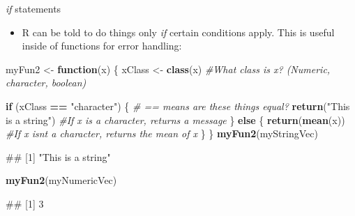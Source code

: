 \documentclass[
  ignorenonframetext,
  aspectratio=169]{beamer}
\newenvironment{Shaded}{\begin{snugshade}}{\end{snugshade}}
\newcommand{\CommentTok}[1]{\textcolor[rgb]{0.56,0.35,0.01}{\textit{#1}}}
\newcommand{\ControlFlowTok}[1]{\textcolor[rgb]{0.13,0.29,0.53}{\textbf{#1}}}
\newcommand{\FunctionTok}[1]{\textcolor[rgb]{0.13,0.29,0.53}{\textbf{#1}}}
\newcommand{\NormalTok}[1]{#1}
\newcommand{\OtherTok}[1]{\textcolor[rgb]{0.56,0.35,0.01}{#1}}
\newcommand{\SpecialCharTok}[1]{\textcolor[rgb]{0.81,0.36,0.00}{\textbf{#1}}}
\newcommand{\StringTok}[1]{\textcolor[rgb]{0.31,0.60,0.02}{#1}}
\providecommand{\tightlist}{%
  \setlength{\itemsep}{0pt}\setlength{\parskip}{0pt}}
\let\oldShaded\Shaded %
\let\endoldShaded\endShaded
\renewenvironment{Shaded}{\footnotesize\oldShaded}{\endoldShaded}
\let\oldverbatim\verbatim %Change fontsize of code chunk output
\let\endoldverbatim\endverbatim
\renewenvironment{verbatim}{\footnotesize\oldverbatim}{\endoldverbatim}
\begin{document}
\begin{frame}[fragile]{\emph{if} statements}
\protect\hypertarget{if-statements}{}
\begin{itemize}[<+->]
\tightlist
\item
  R can be told to do things only \emph{if} certain conditions apply.
  This is useful inside of functions for error handling:
\end{itemize}

\begin{Shaded}
\begin{Highlighting}[]
\NormalTok{myFun2 }\OtherTok{\textless{}{-}} \ControlFlowTok{function}\NormalTok{(x) \{}
\NormalTok{    xClass }\OtherTok{\textless{}{-}} \FunctionTok{class}\NormalTok{(x)  }\CommentTok{\#What class is x? (Numeric, character, boolean)}

    \ControlFlowTok{if}\NormalTok{ (xClass }\SpecialCharTok{==} \StringTok{"character"}\NormalTok{) \{}
        \CommentTok{\# == means \textquotesingle{}are these things equal\textquotesingle{}?}
        \FunctionTok{return}\NormalTok{(}\StringTok{"This is a string"}\NormalTok{)  }\CommentTok{\#If x is a character, returns a message}
\NormalTok{    \} }\ControlFlowTok{else}\NormalTok{ \{}
        \FunctionTok{return}\NormalTok{(}\FunctionTok{mean}\NormalTok{(x))  }\CommentTok{\#If x isn\textquotesingle{}t a character, returns the mean of x}
\NormalTok{    \}}
\NormalTok{\}}
\FunctionTok{myFun2}\NormalTok{(myStringVec)}
\end{Highlighting}
\end{Shaded}

\begin{verbatim}
## [1] "This is a string"
\end{verbatim}

\begin{Shaded}
\begin{Highlighting}[]
\FunctionTok{myFun2}\NormalTok{(myNumericVec)}
\end{Highlighting}
\end{Shaded}

\begin{verbatim}
## [1] 3
\end{verbatim}
\end{frame}
\end{document}
